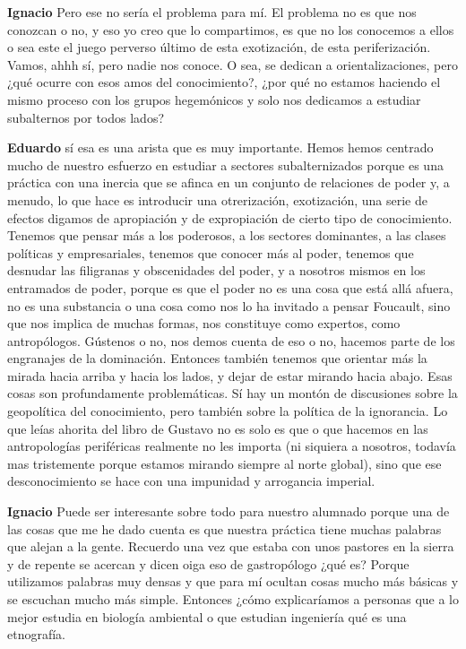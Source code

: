 \documentclass[
  spanish,
  11pt,
  a4paper,
]{scrbook}
\newenvironment{transcripcion}{
    \begin{list}{}{
        \setlength{\leftmargin}{1.5em}  %
        \setlength{\rightmargin}{0em}
        \setlength{\itemsep}{0.2em}     %
        \setlength{\parsep}{0.0em}
        \setlength{\listparindent}{0pt}
    }
}{
    \end{list}
}
\newcommand{\personaje}[1]{\textbf{#1}\quad}
\begin{document}
\begin{transcripcion}
\item \personaje{Ignacio} Pero ese no sería el problema para mí. El problema no es que nos conozcan o no, y eso yo creo que lo compartimos, es que no los conocemos a ellos o sea este el juego perverso último de esta exotización, de esta periferización. Vamos, ahhh sí, pero nadie nos conoce. O sea, se dedican a orientalizaciones, pero ¿qué ocurre con esos amos del conocimiento?, ¿por qué no estamos haciendo el mismo proceso con los grupos hegemónicos y solo nos dedicamos a estudiar subalternos por todos lados?

\item \personaje{Eduardo} sí esa es una arista que es muy importante. Hemos hemos centrado mucho de nuestro esfuerzo en estudiar a sectores subalternizados porque es una práctica con una inercia que se afinca en un conjunto de relaciones de poder y, a menudo, lo que hace es introducir una otrerización, exotización, una serie de efectos digamos de apropiación y de expropiación de cierto tipo de conocimiento. Tenemos que pensar más a los poderosos, a los sectores dominantes, a las clases políticas y empresariales, tenemos que conocer más al poder, tenemos que desnudar las filigranas y obscenidades del poder, y a nosotros mismos en los entramados de poder, porque es que el poder no es una cosa que está allá afuera, no es una substancia o una cosa como nos lo ha invitado a pensar Foucault, sino que nos implica de muchas formas, nos constituye como expertos, como antropólogos. Gústenos o no, nos demos cuenta de eso o no, hacemos parte de los engranajes de la dominación. Entonces también tenemos que orientar más la mirada hacia arriba y hacia los lados, y dejar de estar mirando hacia abajo. Esas cosas son profundamente problemáticas. Sí hay un montón de discusiones sobre la geopolítica del conocimiento, pero también sobre la política de la ignorancia. Lo que leías ahorita del libro de Gustavo no es solo es que o que hacemos en las antropologías periféricas realmente no les importa (ni siquiera a nosotros, todavía mas tristemente porque estamos mirando siempre al norte global), sino que ese desconocimiento se hace con una impunidad y arrogancia imperial.

\item \personaje{Ignacio} Puede ser interesante sobre todo para nuestro alumnado porque una de las cosas que me he dado cuenta es que nuestra práctica tiene muchas palabras que alejan a la gente. Recuerdo una vez que estaba con unos pastores en la sierra y de repente se acercan y dicen oiga eso de gastropólogo ¿qué es? Porque utilizamos palabras muy densas y que para mí ocultan cosas mucho más básicas y se escuchan mucho más simple. Entonces ¿cómo explicaríamos a personas que a lo mejor estudia en biología ambiental o que estudian ingeniería qué es una etnografía.


\end{transcripcion}
\end{document}

